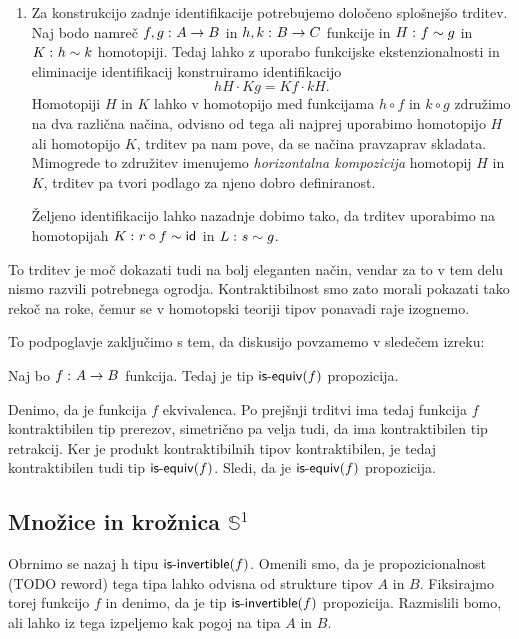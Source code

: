 \begin{dokaz}
\begin{enumerate}
  \item Za konstrukcijo zadnje identifikacije potrebujemo določeno splošnejšo trditev. Naj bodo namreč \(f, g \,\colon A \to B\) in \(h, k \,\colon B \to C\) funkcije in
    \(H \,\colon f \sim g\) in \(K \,\colon h \sim k\) homotopiji. Tedaj lahko z uporabo funkcijske ekstenzionalnosti in eliminacije identifikacij konstruiramo identifikacijo
    \[hH \cdot Kg = Kf \cdot kH.\]
    Homotopiji \(H\) in \(K\) lahko v homotopijo med funkcijama \(h \circ f\) in \(k \circ g\) združimo na dva različna načina, odvisno od tega ali najprej uporabimo homotopijo \(H\) ali homotopijo \(K\), trditev pa nam pove, da se načina pravzaprav skladata. Mimogrede to združitev imenujemo \emph{horizontalna kompozicija} homotopij \(H\) in \(K\), trditev pa tvori podlago za njeno dobro definiranost.

Željeno identifikacijo lahko nazadnje dobimo tako, da trditev uporabimo na homotopijah \(K \,\colon r \circ f \sim \textnormal{\textsf{id}}_{}\) in \(L \,\colon s \sim g\).
\end{enumerate}
\end{dokaz}

To trditev je moč dokazati tudi na bolj eleganten način, vendar za to v tem delu nismo razvili potrebnega ogrodja. Kontraktibilnost smo zato morali pokazati tako rekoč na roke, čemur se v homotopski teoriji tipov ponavadi raje izognemo.

To podpoglavje zaključimo s tem, da diskusijo povzamemo v sledečem izreku:

\begin{izrek}
  \label{is-equiv-prop}
  Naj bo \(f \,\colon A \to B\) funkcija. Tedaj je tip \(\textnormal{\textsf{is-equiv}}(f)\) propozicija.
\end{izrek}

\begin{dokaz}
  Denimo, da je funkcija \(f\) ekvivalenca. Po prejšnji trditvi ima tedaj funkcija \(f\) kontraktibilen tip prerezov, simetrično pa velja tudi, da ima kontraktibilen tip retrakcij. Ker je produkt kontraktibilnih tipov kontraktibilen, je tedaj kontraktibilen tudi tip \(\textnormal{\textsf{is-equiv}}(f)\). Sledi, da je \(\textnormal{\textsf{is-equiv}}(f)\) propozicija.
\end{dokaz}

\subsection{Množice in krožnica \(\mathbb{S}^{1}\)}

Obrnimo se nazaj h tipu \(\textnormal{\textsf{is-invertible}}(f)\). Omenili smo, da je propozicionalnost (TODO reword) tega tipa lahko odvisna od strukture tipov \(A\) in \(B\). Fiksirajmo torej funkcijo \(f\) in denimo, da je tip \(\textnormal{\textsf{is-invertible}}(f)\) propozicija. Razmislili bomo, ali lahko iz tega izpeljemo kak pogoj na tipa \(A\) in \(B\).

